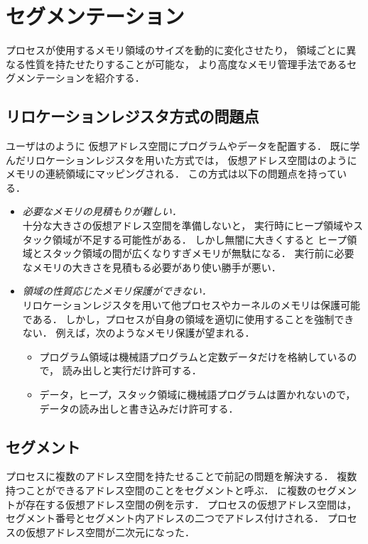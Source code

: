 \chapter{セグメンテーション}
\label{chap:segmentation}
プロセスが使用するメモリ領域のサイズを動的に変化させたり，
領域ごとに異なる性質を持たせたりすることが可能な，
より高度なメモリ管理手法であるセグメンテーションを紹介する．

\section{リロケーションレジスタ方式の問題点}
ユーザはのように
仮想アドレス空間にプログラムやデータを配置する．
既に学んだリロケーションレジスタを用いた方式では，
仮想アドレス空間はのように
メモリの連続領域にマッピングされる．
この方式は以下の問題点を持っている．

\begin{itemize}
\item \emph{必要なメモリの見積もりが難しい．} \\
  十分な大きさの仮想アドレス空間を準備しないと，
  実行時にヒープ領域やスタック領域が不足する可能性がある．
  しかし無闇に大きくすると
  ヒープ領域とスタック領域の間が広くなりすぎメモリが無駄になる．
  実行前に必要なメモリの大きさを見積もる必要があり使い勝手が悪い．
\item \emph{領域の性質応じたメモリ保護ができない．} \\
  リロケーションレジスタを用いて他プロセスやカーネルのメモリは保護可能である．
  しかし，プロセスが自身の領域を適切に使用することを強制できない．
  例えば，次のようなメモリ保護が望まれる．
  \begin{itemize}
  \item プログラム領域は機械語プログラムと定数データだけを格納しているので，
    読み出しと実行だけ許可する．
  \item データ，ヒープ，スタック領域に機械語プログラムは置かれないので，
    データの読み出しと書き込みだけ許可する．
  \end{itemize}
\end{itemize}

\section{セグメント}
プロセスに複数のアドレス空間を持たせることで前記の問題を解決する．
複数持つことができるアドレス空間のことをセグメントと呼ぶ．
に複数のセグメントが存在する仮想アドレス空間の例を示す．
プロセスの仮想アドレス空間は，
セグメント番号とセグメント内アドレスの二つでアドレス付けされる．
プロセスの仮想アドレス空間が二次元になった．

